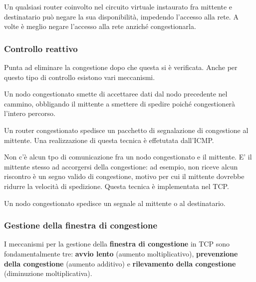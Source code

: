                 Un qualsiasi router coinvolto nel circuito virtuale instaurato fra mittente e destinatario può negare la sua disponibilità, impedendo l'accesso alla rete. A volte è meglio negare l'accesso alla rete anziché congestionarla.
                
        \subsubsection{Controllo reattivo}
        
            Punta ad eliminare la congestione dopo che questa si è verificata. Anche per questo tipo di controllo esistono vari meccanismi.
            
            
                Un nodo congestionato smette di accettaree dati dal nodo precedente nel cammino, obbligando il mittente a smettere di spedire poiché congestionerà l'intero percorso.
                
                
                Un router congestionato spedisce un pacchetto di segnalazione di congestione al mittente. Una realizzazione di questa tecnica è effetutata dall'ICMP.
            
            
                Non c'è alcun tpo di comunicazione fra un nodo congestionato e il mittente.  E' il mittente stesso ad accorgersi della congestione: ad esempio, non riceve alcun riscontro è un segno valido di congestione, motivo per cui il mittente dovrebbe ridurre la velocità di spedizione. Questa tecnica è implementata nel TCP.
                
                
                Un nodo congestionato spedisce un segnale al mittente o al destinatario.
                
        \subsubsection{Gestione della finestra di congestione}
        
            I meccanismi per la gestione della \textbf{finestra di congestione} in TCP sono fondamentalmente tre: \textbf{avvio lento} (aumento moltiplicativo), \textbf{prevenzione della congestione} (aumento additivo) e \textbf{rilevamento della congestione} (diminuzione moltiplicativa).
            
